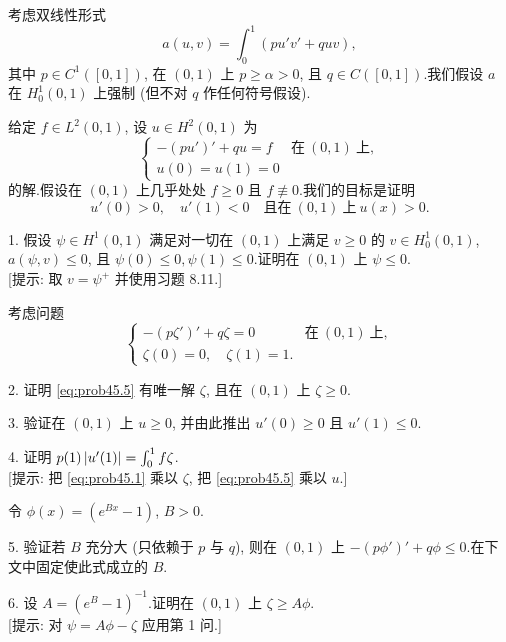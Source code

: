 \begin{problem}
\label{prob:45}
考虑双线性形式
\begin{equation*}
a(u,v)=\int_0^1(pu'v'+quv),
\end{equation*}
其中 $p\in C^1([0,1])$, 在 $(0,1)$ 上 $p\ge\alpha>0$, 且 $q\in C([0,1])$.我们假设
$a$ 在 $H_0^1(0,1)$ 上强制 (但不对 $q$ 作任何符号假设).

给定 $f\in L^2(0,1)$, 设 $u\in H^2(0,1)$ 为
\begin{equation}
\begin{cases}
-(pu')'+qu=f & \text{在}\ (0,1)\ \text{上},\\
u(0)=u(1)=0
\end{cases}
\label{eq:prob45.1}
\end{equation}
的解.假设在 $(0,1)$ 上几乎处处 $f\ge0$ 且 $f\not\equiv0$.我们的目标是证明
\begin{equation}
u'(0)>0,\quad u'(1)<0\quad\text{且在}\ (0,1)\ \text{上}\ u(x)>0.
\label{eq:prob45.2}
\end{equation}

1. 假设 $\psi\in H^1(0,1)$ 满足对一切在 $(0,1)$ 上满足 $v\ge0$ 的 $v\in H_0^1(0,1)$,
$a(\psi,v)\le0$, 且 $\psi(0)\le0,\psi(1)\le0$.证明在 $(0,1)$ 上 $\psi\le0$.\\
{[提示: 取 $v=\psi^+$ 并使用习题 8.11.]}

考虑问题
\begin{equation}
\begin{cases}
-(p\zeta')'+q\zeta=0 & \text{在}\ (0,1)\ \text{上},\\
\zeta(0)=0,\quad\zeta(1)=1.
\end{cases}
\label{eq:prob45.5}
\end{equation}

2. 证明 \eqref{eq:prob45.5} 有唯一解 $\zeta$, 且在 $(0,1)$ 上 $\zeta\ge0$.

3. 验证在 $(0,1)$ 上 $u\ge0$, 并由此推出 $u'(0)\ge0$ 且 $u'(1)\le0$.

4. 证明 $p(1)\left|u'(1)\right|=\int_0^1f\zeta$.\\
{[提示: 把 \eqref{eq:prob45.1} 乘以 $\zeta$, 把 \eqref{eq:prob45.5} 乘以 $u$.]}

令 $\phi(x)=(e^{Bx}-1)$, $B>0$.

5. 验证若 $B$ 充分大 (只依赖于 $p$ 与 $q$), 则在 $(0,1)$ 上
$-(p\phi')'+q\phi\le0$.在下文中固定使此式成立的 $B$.

6. 设 $A=(e^B-1)^{-1}$.证明在 $(0,1)$ 上 $\zeta\ge A\phi$.\\
{[提示: 对 $\psi=A\phi-\zeta$ 应用第 1 问.]}


\end{problem}
